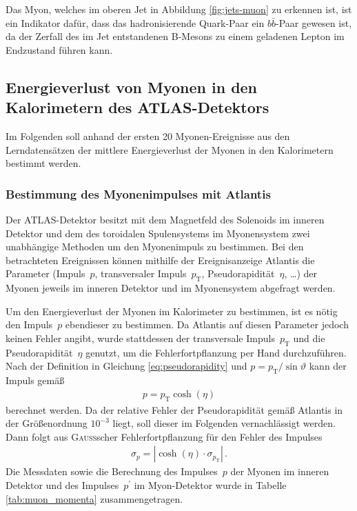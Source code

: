 \documentclass[11pt, a4paper]{article}
\numberwithin{equation}{section}
\begin{document}
Das Myon, welches im oberen Jet in Abbildung \ref{fig:jets-muon} zu erkennen ist, ist ein Indikator dafür, dass das hadronisierende Quark-Paar ein $b\bar{b}$-Paar gewesen ist, da der Zerfall des im Jet entstandenen B-Mesons zu einem geladenen Lepton im Endzustand führen kann.
\vfill

\subsection{Energieverlust von Myonen in den Kalorimetern des ATLAS-Detektors}
Im Folgenden soll anhand der ersten 20 Myonen-Ereignisse aus den Lerndatensätzen der mittlere Energieverlust der Myonen in den Kalorimetern bestimmt werden. 

\subsubsection{Bestimmung des Myonenimpulses mit Atlantis}
\label{sssec:myon_momenta}
Der ATLAS-Detektor besitzt mit dem Magnetfeld des Solenoids im inneren Detektor und dem des toroidalen Spulensystems im Myonensystem zwei unabhängige Methoden um den Myonenimpuls zu bestimmen.
Bei den betrachteten Ereignissen können mithilfe der Ereignisanzeige Atlantis die Parameter (Impuls~$p$, transversaler Impuls~$p_\mathrm{T}$, Pseudorapidität~$\eta$, \dots) der Myonen jeweils im inneren Detektor und im Myonensystem abgefragt werden.

Um den Energieverlust der Myonen im Kalorimeter zu bestimmen, ist es nötig den Impuls~$p$ ebendieser zu bestimmen.
Da Atlantis auf diesen Parameter jedoch keinen Fehler angibt, wurde stattdessen der transversale Impuls~$p_\mathrm{T}$ und die Pseudorapidität~$\eta$ genutzt, um die Fehlerfortpflanzung per Hand durchzuführen.
Nach der Definition in Gleichung \eqref{eq:pseudorapidity} und $p = p_\mathrm{T} / \sin\vartheta$ kann der Impuls gemäß
\begin{align*}
	p = p_\mathrm{T} \cosh(\eta)
\end{align*}
berechnet werden.
Da der relative Fehler der Pseudorapidität gemäß Atlantis in der Größenordnung $10^{-3}$ liegt, soll dieser im Folgenden vernachlässigt werden.
Dann folgt aus \textsc{Gauß}scher Fehlerfortpflanzung für den Fehler des Impulses
\begin{align*}
	\sigma_p = | \cosh(\eta) \cdot \sigma_{p_\mathrm{T}} | \, \text{.}
\end{align*}
Die Messdaten sowie die Berechnung des Impulses~$p$ der Myonen im inneren Detektor und des Impulses~$p^\prime$ im Myon-Detektor wurde in Tabelle \ref{tab:muon_momenta} zusammengetragen.
\end{document}
